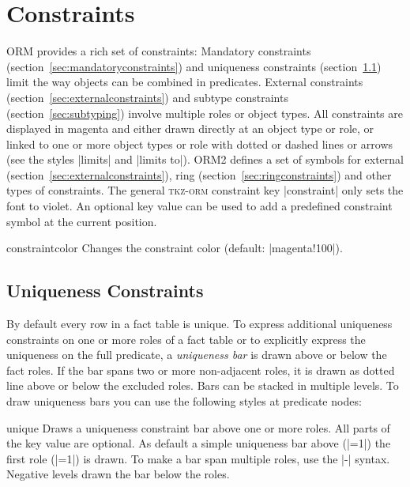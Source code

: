 \documentclass[a4paper,10pt]{article}
\begin{document}
\section{Constraints}
\label{sec:constraints}
ORM provides a rich set of constraints: Mandatory constraints (section~\ref{sec:mandatoryconstraints}) and uniqueness constraints (section~\ref{sec:uniquenessconstraints}) limit the way objects can be combined in predicates. External constraints (section~\ref{sec:externalconstraints}) and subtype constraints (section~\ref{sec:subtyping}) involve multiple roles or object types. All constraints are displayed in magenta and either drawn directly at an object type or role, or linked to one or more object types or role with dotted or dashed lines or arrows (see the styles |limits| and |limits to|). ORM2 defines a set of symbols for external (section~\ref{sec:externalconstraints}), ring (section~\ref{sec:ringconstraints}) and other types of constraints. The general \textsc{tkz-orm} constraint key |constraint| only sets the font to violet. An optional key value can be used to add a predefined constraint symbol at the current position.

\begin{stylekey}{constraintcolor}
Changes the constraint color (default: |magenta!100|).
\end{stylekey}

\subsection{Uniqueness Constraints}
\label{sec:uniquenessconstraints}
By default every row in a fact table is unique. To express additional uniqueness constraints on one or more roles of a fact table or to explicitly express the uniqueness on the full predicate, a \emph{uniqueness bar} is drawn above or below the fact roles. If the bar spans two or more non-adjacent roles, it is drawn as dotted line above or below the excluded roles. Bars can be stacked in multiple levels. To draw uniqueness bars you can use the following styles at predicate nodes:


\begin{stylekey}{unique}
Draws a uniqueness constraint bar above one or more roles. All parts of the key value are optional. As default a simple uniqueness bar above (|=1|) the first role (|=1|) is drawn. To make a bar span multiple roles, use the |-| syntax. Negative levels drawn the bar below the roles.
\begin{codeexample}[]
\end{codeexample}
\end{stylekey}
\end{document}
